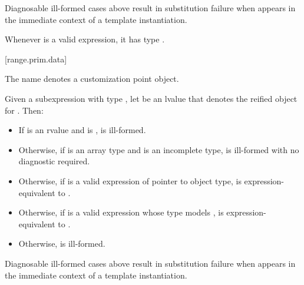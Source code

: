 \pnum
\begin{note}
Diagnosable ill-formed cases above
result in substitution failure when 
appears in the immediate context of a template instantiation.
\end{note}

\pnum
\begin{note}
Whenever  is a valid expression,
it has type .
\end{note}

[range.prim.data]{}
%

\pnum
The name  denotes a customization point
object.

\pnum
Given a subexpression  with type ,
let  be an lvalue that denotes the reified object for .
Then:

\begin{itemize}
\item
  If  is an rvalue and
   is ,
   is ill-formed.

\item
  Otherwise, if  is an array type and
   is an incomplete type,
   is ill-formed with no diagnostic required.

\item
  Otherwise, if 
  is a valid expression of pointer to object type,
   is expression-equivalent to
  .

\item
  Otherwise, if 
  is a valid expression whose type models
  ,
   is expression-equivalent to
  .

\item
  Otherwise,  is ill-formed.
\end{itemize}

\pnum
\begin{note}
Diagnosable ill-formed cases above
result in substitution failure when 
appears in the immediate context of a template instantiation.
\end{note}

